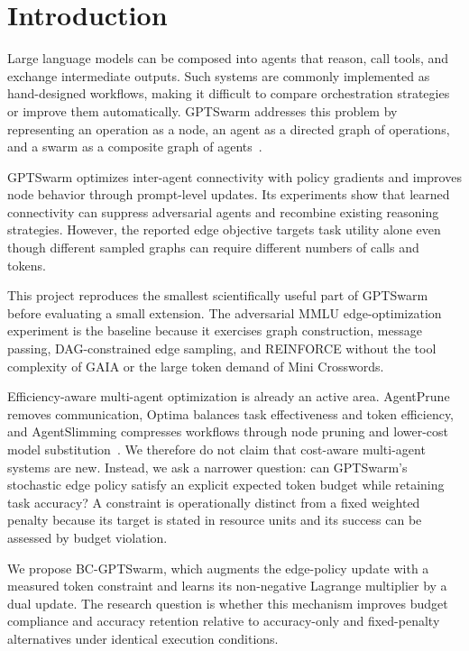 \section{Introduction}

Large language models can be composed into agents that reason, call tools, and exchange intermediate outputs. Such systems are commonly implemented as hand-designed workflows, making it difficult to compare orchestration strategies or improve them automatically. GPTSwarm addresses this problem by representing an operation as a node, an agent as a directed graph of operations, and a swarm as a composite graph of agents~\cite{pmlr-v235-zhuge24a}.

GPTSwarm optimizes inter-agent connectivity with policy gradients and improves node behavior through prompt-level updates. Its experiments show that learned connectivity can suppress adversarial agents and recombine existing reasoning strategies. However, the reported edge objective targets task utility alone even though different sampled graphs can require different numbers of calls and tokens.

This project reproduces the smallest scientifically useful part of GPTSwarm before evaluating a small extension. The adversarial MMLU edge-optimization experiment is the baseline because it exercises graph construction, message passing, DAG-constrained edge sampling, and REINFORCE without the tool complexity of GAIA or the large token demand of Mini Crosswords.

Efficiency-aware multi-agent optimization is already an active area. AgentPrune removes communication, Optima balances task effectiveness and token efficiency, and AgentSlimming compresses workflows through node pruning and lower-cost model substitution~\cite{zhang2024agentprune,chen2024optima,chen2026agentslimming}. We therefore do not claim that cost-aware multi-agent systems are new. Instead, we ask a narrower question: can GPTSwarm's stochastic edge policy satisfy an explicit expected token budget while retaining task accuracy? A constraint is operationally distinct from a fixed weighted penalty because its target is stated in resource units and its success can be assessed by budget violation.

We propose BC-GPTSwarm, which augments the edge-policy update with a measured token constraint and learns its non-negative Lagrange multiplier by a dual update. The research question is whether this mechanism improves budget compliance and accuracy retention relative to accuracy-only and fixed-penalty alternatives under identical execution conditions.

